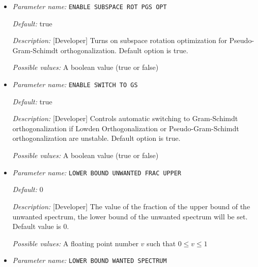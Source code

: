 \begin{itemize}
{\it Possible values:} An integer $n$ such that $1\leq n \leq 2147483647$
\item {\it Parameter name:} {\tt ENABLE SUBSPACE ROT PGS OPT}
\label{parameters:SCF parameters/Eigen_2dsolver parameters/ENABLE SUBSPACE ROT PGS OPT}
\label{parameters:SCF_20parameters/Eigen_2dsolver_20parameters/ENABLE_20SUBSPACE_20ROT_20PGS_20OPT}




{\it Default:} true


{\it Description:} [Developer] Turns on subspace rotation optimization for Pseudo-Gram-Schimdt orthogonalization. Default option is true.


{\it Possible values:} A boolean value (true or false)
\item {\it Parameter name:} {\tt ENABLE SWITCH TO GS}
\label{parameters:SCF parameters/Eigen_2dsolver parameters/ENABLE SWITCH TO GS}
\label{parameters:SCF_20parameters/Eigen_2dsolver_20parameters/ENABLE_20SWITCH_20TO_20GS}




{\it Default:} true


{\it Description:} [Developer] Controls automatic switching to Gram-Schimdt orthogonalization if Lowden Orthogonalization or Pseudo-Gram-Schimdt orthogonalization are unstable. Default option is true.


{\it Possible values:} A boolean value (true or false)
\item {\it Parameter name:} {\tt LOWER BOUND UNWANTED FRAC UPPER}
\label{parameters:SCF parameters/Eigen_2dsolver parameters/LOWER BOUND UNWANTED FRAC UPPER}
\label{parameters:SCF_20parameters/Eigen_2dsolver_20parameters/LOWER_20BOUND_20UNWANTED_20FRAC_20UPPER}




{\it Default:} 0


{\it Description:} [Developer] The value of the fraction of the upper bound of the unwanted spectrum, the lower bound of the unwanted spectrum will be set. Default value is 0.


{\it Possible values:} A floating point number $v$ such that $0 \leq v \leq 1$
\item {\it Parameter name:} {\tt LOWER BOUND WANTED SPECTRUM}
\label{parameters:SCF parameters/Eigen_2dsolver parameters/LOWER BOUND WANTED SPECTRUM}
\label{parameters:SCF_20parameters/Eigen_2dsolver_20parameters/LOWER_20BOUND_20WANTED_20SPECTRUM}



\end{itemize}
